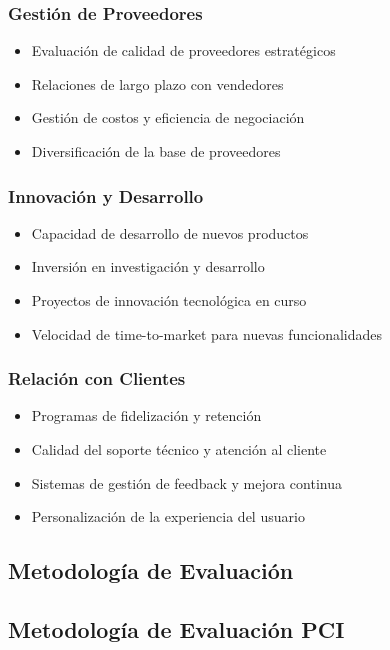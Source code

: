 \subsubsection{Gestión de Proveedores}
\begin{itemize}
\item Evaluación de calidad de proveedores estratégicos
\item Relaciones de largo plazo con vendedores
\item Gestión de costos y eficiencia de negociación
\item Diversificación de la base de proveedores
\end{itemize}

\subsubsection{Innovación y Desarrollo}
\begin{itemize}
\item Capacidad de desarrollo de nuevos productos
\item Inversión en investigación y desarrollo
\item Proyectos de innovación tecnológica en curso
\item Velocidad de time-to-market para nuevas funcionalidades
\end{itemize}

\subsubsection{Relación con Clientes}
\begin{itemize}
\item Programas de fidelización y retención
\item Calidad del soporte técnico y atención al cliente
\item Sistemas de gestión de feedback y mejora continua
\item Personalización de la experiencia del usuario
\end{itemize}

\subsection{Metodología de Evaluación}

\subsection{Metodología de Evaluación PCI}

